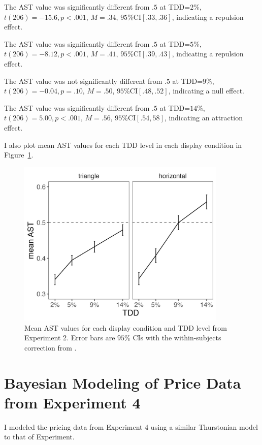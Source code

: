 The AST value was significantly different from $.5$ at TDD=$2\%$, $\textit{t}(206)=-15.6,\textit{p}<.001$, $\textit{M}=.34$, $95\%\text{CI}[.33,.36]$, indicating a repulsion effect. 

The AST value was significantly different from $.5$ at TDD=$5\%$, $\textit{t}(206)=-8.12,\textit{p}<.001$, $\textit{M}=.41$, $95\%\text{CI}[.39,.43]$, indicating a repulsion effect. 

The AST value was not significantly different from $.5$ at TDD=$9\%$, $\textit{t}(206)=-0.04,\textit{p}=.10$, $\textit{M}=.50$, $95\%\text{CI}[.48,.52]$, indicating a null effect. 

The AST value was significantly different from $.5$ at TDD=$14\%$, $\textit{t}(206)=5.00,\textit{p}<.001$, $\textit{M}=.56$, $95\%\text{CI}[.54,58]$, indicating an attraction effect. 

I also plot mean AST values for each TDD level in each display condition in Figure~\ref{fig:e2_ast}.

\begin{figure}
   \includegraphics[width=100mm]{figures/choicePhase_mean_ast.jpeg}
   \caption{Mean AST values for each display condition and TDD level from Experiment 2. Error bars are $95\%$ CIs with the within-subjects correction from \textcite{cousineau2014error}.}
   \label{fig:e2_ast}
\end{figure}

\chapter{Bayesian Modeling of Price Data from Experiment 4}

I modeled the pricing data from Experiment 4 using a similar Thurstonian model to that of Experiment.

